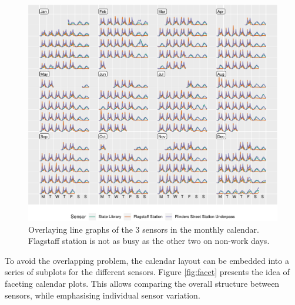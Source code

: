 \documentclass[12pt]{article}
\begin{document}
\begin{figure}

{\centering \includegraphics[width=\textwidth]{figure/overlay-1} 

}

\caption{Overlaying line graphs of the 3 sensors in the monthly calendar. Flagstaff station is not as busy as the other two on non-work days.}\label{fig:overlay}
\end{figure}

To avoid the overlapping problem, the calendar layout can be embedded
into a series of subplots for the different sensors. Figure
\ref{fig:facet} presents the idea of faceting calendar plots. This
allows comparing the overall structure between sensors, while
emphasising individual sensor variation.
\end{document}
